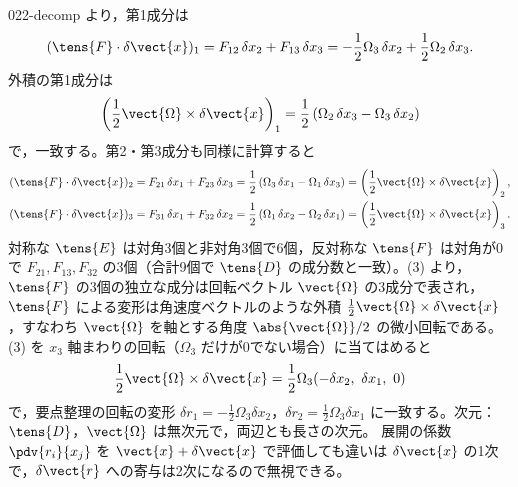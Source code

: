 \documentclass[uplatex,dvipdfmx,a4paper,11pt]{jsarticle}
\begin{document}
\begin{kaisetsu}{022-decomp}
  より，第1成分は
\[ (\tens{F}\cdot\delta\vect{x})_1=F_{12}\,\delta x_2+F_{13}\,\delta x_3=-\frac{1}{2}\Omega_3\,\delta x_2+\frac{1}{2}\Omega_2\,\delta x_3. \]
外積の第1成分は
\[ \left(\frac{1}{2}\vect{\Omega}\times\delta\vect{x}\right)_1=\frac{1}{2}\left(\Omega_2\,\delta x_3-\Omega_3\,\delta x_2\right) \]
で，一致する。第2・第3成分も同様に計算すると
\begin{align*}
(\tens{F}\cdot\delta\vect{x})_2&=F_{21}\,\delta x_1+F_{23}\,\delta x_3=\frac{1}{2}\left(\Omega_3\,\delta x_1-\Omega_1\,\delta x_3\right)=\left(\frac{1}{2}\vect{\Omega}\times\delta\vect{x}\right)_2,\\
(\tens{F}\cdot\delta\vect{x})_3&=F_{31}\,\delta x_1+F_{32}\,\delta x_2=\frac{1}{2}\left(\Omega_1\,\delta x_2-\Omega_2\,\delta x_1\right)=\left(\frac{1}{2}\vect{\Omega}\times\delta\vect{x}\right)_3.
\end{align*}
 対称な $\tens{E}$ は対角3個と非対角3個で6個，反対称な $\tens{F}$ は対角が0で $F_{21},F_{13},F_{32}$ の3個（合計9個で $\tens{D}$ の成分数と一致）。(3) より，$\tens{F}$ の3個の独立な成分は回転ベクトル $\vect{\Omega}$ の3成分で表され，$\tens{F}$ による変形は角速度ベクトルのような外積 $\frac{1}{2}\vect{\Omega}\times\delta\vect{x}$，すなわち $\vect{\Omega}$ を軸とする角度 $\abs{\vect{\Omega}}/2$ の微小回転である。
\kenzan (3) を $x_3$ 軸まわりの回転（$\Omega_3$ だけが0でない場合）に当てはめると
\[ \frac{1}{2}\vect{\Omega}\times\delta\vect{x}=\frac{1}{2}\Omega_3(-\delta x_2,\ \delta x_1,\ 0) \]
で，要点整理の回転の変形 $\delta r_1=-\frac{1}{2}\Omega_3\delta x_2$，$\delta r_2=\frac{1}{2}\Omega_3\delta x_1$ に一致する。次元：$\tens{D}$，$\vect{\Omega}$ は無次元で，両辺とも長さの次元。
\tsumazuki 展開の係数 $\pdv{r_i}{x_j}$ を $\vect{x}+\delta\vect{x}$ で評価しても違いは $\delta\vect{x}$ の1次で，$\delta\vect{r}$ への寄与は2次になるので無視できる。
\end{kaisetsu}
\end{document}

